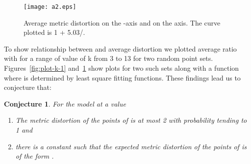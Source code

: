 \documentclass[11pt]{article}
\newtheorem{conjecture}[theorem]{Conjecture}
\begin{document}
\begin{figure}
  \begin{center}
    \texttt{[image: a2.eps]}
  \end{center}
\label{fig:plot-k-2}
\caption{Average metric distortion on the -axis and  on the
   axis. The curve plotted is 1 + 5.03/.}
\end{figure}


To show relationship between  and average distortion we plotted
average ratio with  for a range of value of k from 3 to 13 for
two random point sets. Figures~\ref{fig:plot-k-1}
and~\ref{fig:plot-k-2} show plots for two such sets along with a
function  where  is determined by least square
fitting functions. These findings lead us to conjecture that:

\begin{conjecture}
For the  model at a value 
\begin{enumerate}
\item The metric distortion of the points of  is at most 2
  with probability tending to 1 and 
\item there is a constant such that the expected metric distortion of
  the points of  is of the form .
\end{enumerate}
\end{conjecture}
\end{document}
